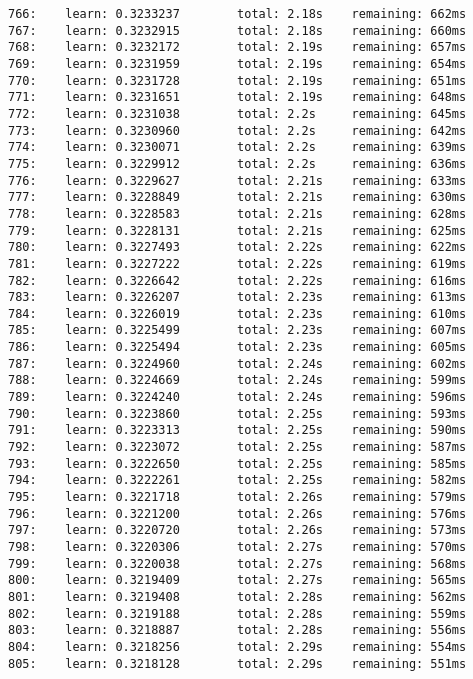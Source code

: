 \documentclass[11pt]{article}
\begin{document}
\begin{Verbatim}[commandchars=\\\{\}]
766:    learn: 0.3233237        total: 2.18s    remaining: 662ms
767:    learn: 0.3232915        total: 2.18s    remaining: 660ms
768:    learn: 0.3232172        total: 2.19s    remaining: 657ms
769:    learn: 0.3231959        total: 2.19s    remaining: 654ms
770:    learn: 0.3231728        total: 2.19s    remaining: 651ms
771:    learn: 0.3231651        total: 2.19s    remaining: 648ms
772:    learn: 0.3231038        total: 2.2s     remaining: 645ms
773:    learn: 0.3230960        total: 2.2s     remaining: 642ms
774:    learn: 0.3230071        total: 2.2s     remaining: 639ms
775:    learn: 0.3229912        total: 2.2s     remaining: 636ms
776:    learn: 0.3229627        total: 2.21s    remaining: 633ms
777:    learn: 0.3228849        total: 2.21s    remaining: 630ms
778:    learn: 0.3228583        total: 2.21s    remaining: 628ms
779:    learn: 0.3228131        total: 2.21s    remaining: 625ms
780:    learn: 0.3227493        total: 2.22s    remaining: 622ms
781:    learn: 0.3227222        total: 2.22s    remaining: 619ms
782:    learn: 0.3226642        total: 2.22s    remaining: 616ms
783:    learn: 0.3226207        total: 2.23s    remaining: 613ms
784:    learn: 0.3226019        total: 2.23s    remaining: 610ms
785:    learn: 0.3225499        total: 2.23s    remaining: 607ms
786:    learn: 0.3225494        total: 2.23s    remaining: 605ms
787:    learn: 0.3224960        total: 2.24s    remaining: 602ms
788:    learn: 0.3224669        total: 2.24s    remaining: 599ms
789:    learn: 0.3224240        total: 2.24s    remaining: 596ms
790:    learn: 0.3223860        total: 2.25s    remaining: 593ms
791:    learn: 0.3223313        total: 2.25s    remaining: 590ms
792:    learn: 0.3223072        total: 2.25s    remaining: 587ms
793:    learn: 0.3222650        total: 2.25s    remaining: 585ms
794:    learn: 0.3222261        total: 2.25s    remaining: 582ms
795:    learn: 0.3221718        total: 2.26s    remaining: 579ms
796:    learn: 0.3221200        total: 2.26s    remaining: 576ms
797:    learn: 0.3220720        total: 2.26s    remaining: 573ms
798:    learn: 0.3220306        total: 2.27s    remaining: 570ms
799:    learn: 0.3220038        total: 2.27s    remaining: 568ms
800:    learn: 0.3219409        total: 2.27s    remaining: 565ms
801:    learn: 0.3219408        total: 2.28s    remaining: 562ms
802:    learn: 0.3219188        total: 2.28s    remaining: 559ms
803:    learn: 0.3218887        total: 2.28s    remaining: 556ms
804:    learn: 0.3218256        total: 2.29s    remaining: 554ms
805:    learn: 0.3218128        total: 2.29s    remaining: 551ms

\end{Verbatim}
\end{document}
